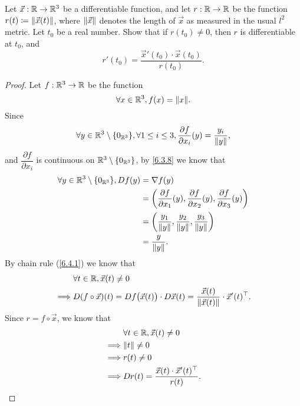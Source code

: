 \begin{ex}\label{ex:6.4.5}
  Let \(\vec{x} : \R \to \R^3\) be a differentiable function, and let \(r : \R \to \R\) be the function \(r(t) \coloneqq \norm*{\vec{x}(t)}\), where \(\norm*{\vec{x}}\) denotes the length of \(\vec{x}\) as measured in the usual \(l^2\) metric.
  Let \(t_0\) be a real number.
  Show that if \(r(t_0) \neq 0\), then \(r\) is differentiable at \(t_0\), and
  \[
    r'(t_0) = \dfrac{\vec{x}'(t_0) \cdot \vec{x}(t_0)}{r(t_0)}.
  \]
\end{ex}

\begin{proof}
  Let \(f : \R^3 \to \R\) be the function
  \[
    \forall x \in \R^3, f(x) = \norm*{x}.
  \]
  Since
  \[
    \forall y \in \R^3 \setminus \{0_{\R^3}\}, \forall 1 \leq i \leq 3, \dfrac{\partial f}{\partial x_i}(y) = \dfrac{y_i}{\norm*{y}},
  \]
  and \(\dfrac{\partial f}{\partial x_i}\) is continuous on \(\R^3 \setminus \{0_{\R^3}\}\), by \cref{6.3.8} we know that
  \begin{align*}
    \forall y \in \R^3 \setminus \{0_{\R^3}\}, D f(y) & = \nabla f(y)                                                                                                               \\
                                                      & = \bigg(\dfrac{\partial f}{\partial x_1}(y), \dfrac{\partial f}{\partial x_2}(y), \dfrac{\partial f}{\partial x_3}(y)\bigg) \\
                                                      & = \bigg(\dfrac{y_1}{\norm*{y}}, \dfrac{y_2}{\norm*{y}}, \dfrac{y_3}{\norm*{y}}\bigg)                                        \\
                                                      & = \dfrac{y}{\norm*{y}}.
  \end{align*}
  By chain rule (\cref{6.4.1}) we know that
  \begin{align*}
             & \forall t \in \R, \vec{x}(t) \neq 0                                                                                                  \\
    \implies & D (f \circ \vec{x})(t) = D f\big(\vec{x}(t)\big) \cdot D \vec{x}(t) = \dfrac{\vec{x}(t)}{\norm*{\vec{x}(t)}} \cdot \vec{x}'(t)^\top.
  \end{align*}
  Since \(r = f \circ \vec{x}\), we know that
  \begin{align*}
             & \forall t \in \R, \vec{x}(t) \neq 0                       \\
    \implies & \norm*{t} \neq 0                                          \\
    \implies & r(t) \neq 0                                               \\
    \implies & D r(t) = \dfrac{\vec{x}(t) \cdot \vec{x}'(t)^\top}{r(t)}.
  \end{align*}
\end{proof}